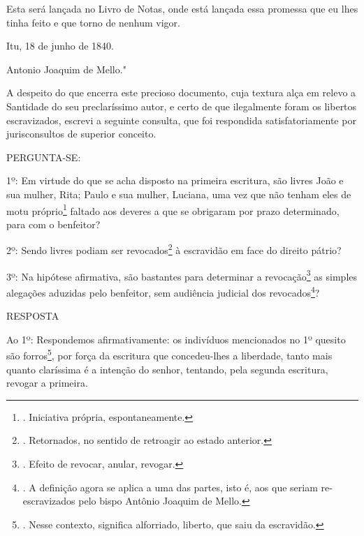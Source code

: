 Esta será lançada no Livro de Notas, onde está lançada essa promessa que
eu lhes tinha feito e que torno de nenhum vigor.

Itu, 18 de junho de 1840.

Antonio Joaquim de Mello."

A despeito do que encerra este precioso documento, cuja textura alça em
relevo a Santidade do seu preclaríssimo autor, e certo de que
ilegalmente foram os libertos escravizados, escrevi a seguinte consulta,
que foi respondida satisfatoriamente por jurisconsultos de superior
conceito.

PERGUNTA-SE:

1º: Em virtude do que se acha disposto na primeira escritura, são livres
João e sua mulher, Rita; Paulo e sua mulher, Luciana, uma vez que não
tenham eles de motu próprio\footnote{. Iniciativa própria,
  espontaneamente.} faltado aos deveres a que se obrigaram por prazo
determinado, para com o benfeitor?

2º: Sendo livres podiam ser revocados\footnote{. Retornados, no sentido
  de retroagir ao estado anterior.} à escravidão em face do direito
pátrio?

3º: Na hipótese afirmativa, são bastantes para determinar a
revocação\footnote{. Efeito de revocar, anular, revogar.} as simples
alegações aduzidas pelo benfeitor, sem audiência judicial dos
revocados\footnote{. A definição agora se aplica a uma das partes, isto
  é, aos que seriam re-escravizados pelo bispo Antônio Joaquim de Mello.}?

RESPOSTA

Ao 1º: Respondemos afirmativamente: os indivíduos mencionados no 1º
quesito são forros\footnote{. Nesse contexto, significa alforriado,
  liberto, que saiu da escravidão.}, por força da escritura que
concedeu-lhes a liberdade, tanto mais quanto claríssima é a intenção do
senhor, tentando, pela segunda escritura, revogar a primeira.

